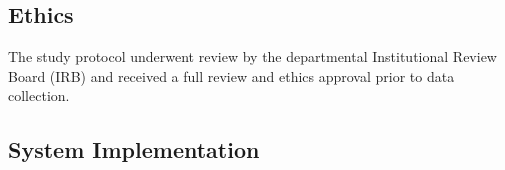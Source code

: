 \documentclass[sigconf]{acmart}
\begin{document}

\subsection{Ethics}
The study protocol underwent review by the departmental Institutional Review Board (IRB) and received a full review and ethics approval prior to data collection. 

\subsection{System Implementation}
\label{sec:implementation}

\end{document}
